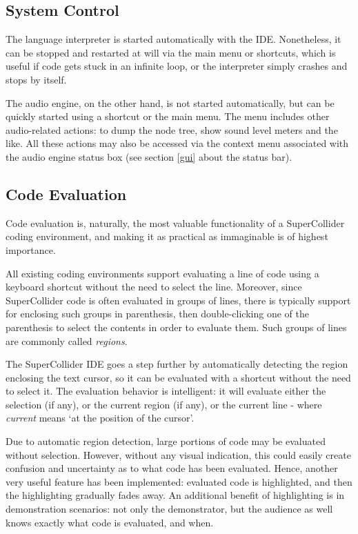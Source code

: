 \documentclass[11pt,a4paper]{article}
\begin{document}
\subsection{System Control}

The language interpreter is started automatically with the IDE. Nonetheless, it can be stopped and restarted at will
via the main menu or shortcuts, which is useful if code gets stuck in an infinite loop, or the interpreter simply
crashes and stops by itself.

The audio engine, on the other hand, is not started automatically, but can be quickly started using a shortcut or the
main menu. The menu includes other audio-related actions: to dump the node tree, show sound level meters and the like.
All these actions may also be accessed via the context menu associated with the audio engine status box (see section
\ref{gui} about the status bar).

\subsection{Code Evaluation}
\label{code-eval}

Code evaluation is, naturally, the most valuable functionality of a SuperCollider coding environment, and making it as
practical as immaginable is of highest importance.

All existing coding environments support evaluating a line of code using a keyboard shortcut without the need to select
the line. Moreover, since SuperCollider code is often evaluated in groups of lines, there is typically support for
enclosing such groups in parenthesis, then double-clicking one of the parenthesis to select the contents in order to
evaluate them. Such groups of lines are commonly called \emph{regions}.

The SuperCollider IDE goes a step further by automatically detecting the region enclosing the text cursor, so it can be
evaluated with a shortcut without the need to select it. The evaluation behavior is intelligent: it will evaluate
either the selection (if any), or the current region (if any), or the current line - where \emph{current} means `at the
position of the cursor'.

Due to automatic region detection, large portions of code may be evaluated without selection. However, without any
visual indication, this could easily create confusion and uncertainty as to what code has been evaluated. Hence,
another very useful feature has been implemented: evaluated code is highlighted, and then the highlighting gradually
fades away. An additional benefit of highlighting is in demonstration scenarios: not only the demonstrator, but the
audience as well knows exactly what code is evaluated, and when.
\end{document}
